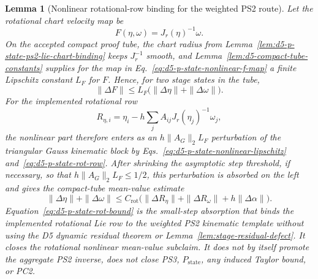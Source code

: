 \documentclass[preprint,12pt]{elsarticle}
\newtheorem{lemma}{Lemma}
\begin{document}
\begin{lemma}[Nonlinear rotational-row binding for the weighted PS2 route]
\label{lem:d5-p-state-ps2-nonlinear-binding}
Let the rotational chart velocity map be
\begin{equation}
\label{eq:d5-p-state-nonlinear-f-map}
F(\eta,\omega)=J_r(\eta)^{-1}\omega .
\end{equation}
On the accepted compact proof tube, the chart radius from
Lemma~\ref{lem:d5-p-state-ps2-lie-chart-binding} keeps \(J_r^{-1}\) smooth,
and Lemma~\ref{lem:d5-compact-tube-constants} supplies for the map in
Eq.~\eqref{eq:d5-p-state-nonlinear-f-map} a finite Lipschitz
constant \(L_F\) for \(F\).  Hence, for two stage states in the tube,
\begin{equation}
\label{eq:d5-p-state-nonlinear-lipschitz}
\|\Delta F\|\le L_F\bigl(\|\Delta\eta\|+\|\Delta\omega\|\bigr).
\end{equation}
For the implemented rotational row
\begin{equation}
\label{eq:d5-p-state-rot-row}
R_{\eta,i}=\eta_i-h\sum_j A_{ij}J_r(\eta_j)^{-1}\omega_j ,
\end{equation}
the nonlinear part therefore enters as an \(h\|A_G\|_2L_F\) perturbation of
the triangular Gauss kinematic block by Eqs.~\eqref{eq:d5-p-state-nonlinear-lipschitz}
and~\eqref{eq:d5-p-state-rot-row}.  After shrinking the asymptotic step
threshold, if necessary, so that \(h\|A_G\|_2L_F\le 1/2\), this perturbation is
absorbed on the left and gives the compact-tube mean-value estimate
\begin{equation}
\label{eq:d5-p-state-rot-bound}
\|\Delta\eta\|+\|\Delta\omega\|
\le C_{\mathrm{rot}}
\bigl(\|\Delta R_\eta\|+\|\Delta R_\omega\|+h\|\Delta\alpha\|\bigr).
\end{equation}
Equation~\eqref{eq:d5-p-state-rot-bound} is the small-step absorption that
binds the implemented rotational Lie row to the
weighted PS2 kinematic template without using the D5 dynamic residual theorem
or Lemma~\ref{lem:stage-residual-defect}.  It closes the rotational nonlinear
mean-value subclaim.  It does not by itself promote the aggregate PS2 inverse,
does not close PS3, \(P_{\mathrm{state}}\), any induced Taylor bound, or PC2.
\end{lemma}
\end{document}
